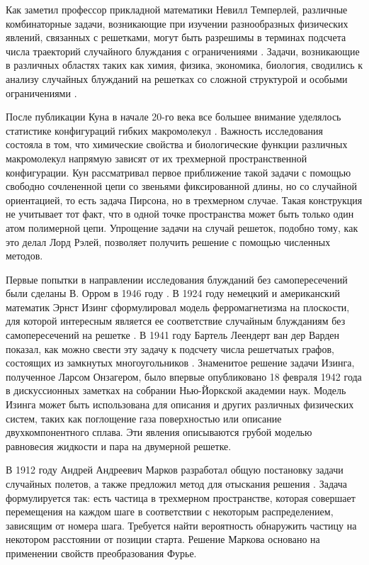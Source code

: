 Как заметил профессор прикладной математики Невилл Темперлей, различные комбинаторные задачи, возникающие при изучении разнообразных физических явлений, связанных с решетками, могут быть разрешимы в терминах подсчета числа траекторий случайного блуждания с ограничениями \cite{temperley_combinatorial_1956}. Задачи, возникающие в различных областях таких как химия, физика, экономика, биология, сводились к анализу случайных блужданий на решетках со сложной структурой и особыми ограничениями \cite{kuhn_uber_1930, flory_principles_1953, gee_interaction_1946, ising_beitrag_1925, tricomi_funzioni_1954}. 

После публикации Куна в начале 20-го века все большее внимание уделялось статистике конфигураций гибких макромолекул \cite{kuhn_uber_1930}. Важность исследования состояла в том, что химические свойства и биологические функции различных макромолекул напрямую зависят от их трехмерной пространственной конфигурации. Кун рассматривал первое приближение такой задачи с помощью свободно сочлененной цепи со звеньями фиксированной длины, но со случайной ориентацией, то есть задача Пирсона, но в трехмерном случае. Такая конструкция не учитывает тот факт, что в одной точке пространства может быть только один атом полимерной цепи. Упрощение задачи на случай решеток, подобно тому, как это делал Лорд Рэлей, позволяет получить решение с помощью численных методов.

Первые попытки в направлении исследования блужданий без самопересечений были сделаны В. Орром в 1946 году \cite{gee_interaction_1946}. В 1924 году немецкий и американский математик Эрнст Изинг сформулировал модель ферромагнетизма на плоскости, для которой интересным является ее соответствие случайным блужданиям без самопересечений на решетке \cite{ising_beitrag_1925}. В 1941 году Бартель Леендерт ван дер Варден показал, как можно свести эту задачу к подсчету числа решетчатых графов, состоящих из замкнутых многоугольников \cite{van_der_waerden_lange_1941}. Знаменитое решение задачи Изинга, полученное Ларсом Онзагером, было впервые опубликовано 18 февраля 1942 года в дискуссионных заметках на собрании Нью-Йоркской академии наук. Модель Изинга может быть использована для описания и других различных физических систем, таких как поглощение газа поверхностью или описание двухкомпонентного сплава. Эти явления описываются грубой моделью равновесия жидкости и пара на двумерной решетке.

В 1912 году Андрей Андреевич Марков разработал общую постановку задачи случайных полетов, а также предложил метод для отыскания решения \cite{markov_wahrscheinlichkeitsrechnung_1912}. Задача формулируется так: есть частица в трехмерном пространстве, которая совершает перемещения на каждом шаге в соответствии с некоторым распределением, зависящим от номера шага. Требуется найти вероятность обнаружить частицу на некотором расстоянии от позиции старта. Решение Маркова основано на применении свойств преобразования Фурье.

